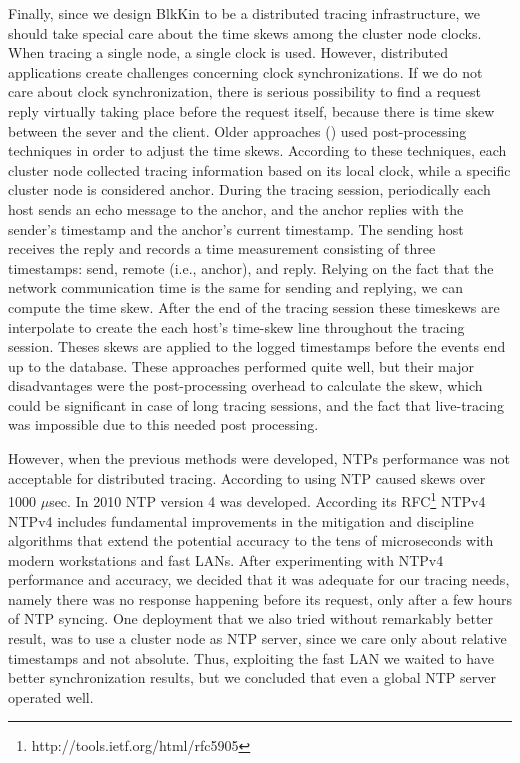 Finally, since we design BlkKin to be a distributed tracing infrastructure, we
should take special care about the time skews among the cluster node clocks.
When tracing a single node, a single clock is used. However, distributed
applications create challenges concerning clock synchronizations. If we do not
care about clock synchronization, there is serious possibility to find a request
reply virtually taking place before the request itself, because there is time
skew between the sever and the client. Older approaches (\cite{hp}) used
post-processing techniques in order to adjust the time skews. According to these
techniques, each cluster node collected tracing information based on its local
clock, while a specific cluster node is considered anchor. During the tracing
session, periodically each host sends an echo message to the anchor, and the
anchor replies with the sender's timestamp and the anchor's current timestamp.
The sending host receives the reply and records a time measurement consisting of
three timestamps: send, remote (i.e., anchor), and reply. Relying on the fact
that the network communication time is the same for sending and replying, we can
compute the time skew. After the end of the tracing session these timeskews are
interpolate to create the each host's time-skew line throughout the tracing
session. Theses skews are applied to the logged timestamps before the events end
up to the database. These approaches performed quite well, but their major
disadvantages were the post-processing overhead to calculate the skew, which
could be significant in case of long tracing sessions, and the fact that
live-tracing was impossible due to this needed post processing.

However, when the previous methods were developed, NTPs performance was not
acceptable for distributed tracing. According to \cite{hp} using NTP caused
skews over 1000 $\mu$sec. In 2010 NTP version 4 was developed. According its
RFC\footnote{http://tools.ietf.org/html/rfc5905} NTPv4 NTPv4 includes
fundamental improvements in the mitigation and discipline algorithms that extend
the potential accuracy to the tens of microseconds with modern workstations and
fast LANs. After experimenting with NTPv4 performance and accuracy, we decided
that it was adequate for our tracing needs, namely there was no response
happening before its request, only after a few hours of NTP syncing. One
deployment that we also tried without remarkably better result, was to use a
cluster node as NTP server, since we care only about relative timestamps and not
absolute. Thus, exploiting the fast LAN we waited to have better synchronization
results, but we concluded that even a global NTP server operated well.

